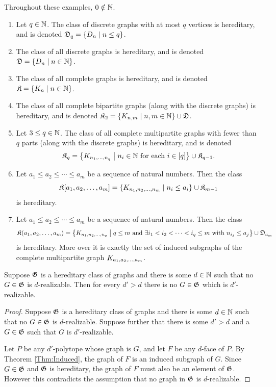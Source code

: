     \begin{Example}  Throughout these examples, \(0\notin\mathbb{N}\).
        \begin{enumerate}
            \item   Let \(q\in\mathbb{N}\).  The class of discrete graphs with at most \(q\) vertices is hereditary, and is denoted \(\mf D_q=\setb{D_n}{n\le q}\).
            \item   The class of all discrete graphs is hereditary, and is denoted \(\mf D=\setb{D_n}{n\in\N}\).
            \item   The class of all complete graphs is hereditary, and is denoted \(\mf K=\setb{K_n}{n\in\N}\).
            \item   The class of all complete bipartite graphs (along with the discrete graphs) is hereditary, and is denoted \(\mf K_2=\setb{K_{n,m}}{n,m\in\N}\cup\mf D\).
            \item   Let \(3\le q\in\mathbb{N}\). The class of all complete multipartite graphs with fewer than \(q\) parts (along with the discrete graphs) is hereditary, and is denoted
                    \[
                        \mf K_q=\setb{K_{n_1\dc n_q}}{n_i\in\N\text{ for each }i\in\brac q}\cup\mf K_{q-1}.
                    \]
            \item   Let \(a_1\le a_2\le\dotsb\le a_m\) be a sequence of natural numbers.  Then the class
                \[
                    \mf K[a_1,a_2\dc a_m]=\setb{K_{n_1,n_2\dc n_m}}{n_i\le a_i}\cup\mf K_{m-1}
                \]
                is hereditary.
            \item   Let \(a_1\le a_2\le\dotsb\le a_m\) be a sequence of natural numbers.  Then the class
                \[
                    \mf K(a_1,a_2\dc a_m)=\setb{K_{n_1,n_2\dc n_q}}{q\le m\text{ and }\exists i_1<i_2<\dotsb<i_q\le m\text{ with }n_{i_j}\le a_j}\cup\mf D_{a_m}
                \]
                is hereditary.  More over it is exactly the set of induced subgraphs of the complete multipartite graph \(K_{a_1,a_2,\dotsc, a_m}\).
        \end{enumerate}

        \begin{Theorem}\label{Thm:Heredity}
            Suppose \(\mathfrak{G}\) is a hereditary class of graphs and there is some \(d\in\mathbb{N}\) such that no \(G\in\mathfrak{G}\) is \(d\)-realizable.  Then for every \(d'>d\) there is no \(G\in\mathfrak{G}\) which is \(d'\)-realizable.
        \end{Theorem}
        \begin{proof}
            Suppose \(\mathfrak{G}\) is a hereditary class of graphs and there is some \(d\in\mathbb{N}\) such that no \(G\in\mathfrak{G}\) is \(d\)-realizable.  Suppose further that there is some \(d'>d\) and a \(G\in\mathfrak{G}\) such that \(G\) is \(d'\)-realizable.

            Let \(P\) be any \(d'\)-polytope whose graph is \(G\), and let \(F\) be any \(d\)-face of \(P\).  By Theorem \ref{Thm:Induced}, the graph of \(F\) is an induced subgraph of \(G\).  Since \(G\in\mathfrak{G}\) and \(\mathfrak{G}\) is hereditary, the graph of \(F\) must also be an element of \(\mathfrak{G}\).  However this contradicts the assumption that no graph in \(\mathfrak{G}\) is \(d\)-realizable.
        \end{proof}
    \end{Example}
